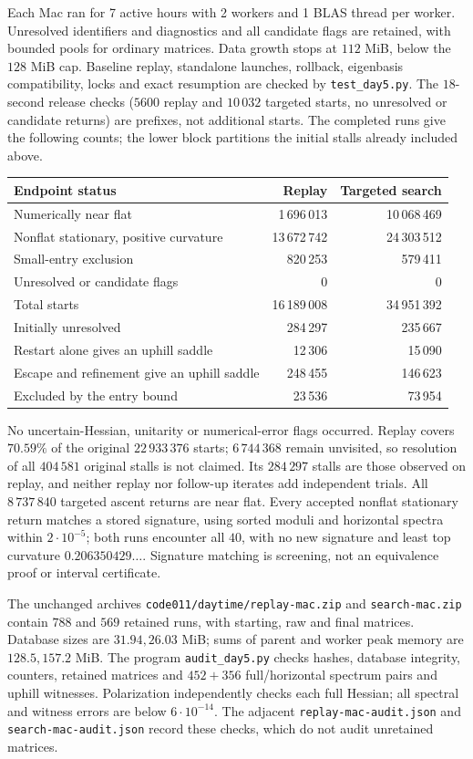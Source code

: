 \documentclass[11pt,a4paper]{article}
\begin{document}
Each Mac ran for 7 active hours with 2 workers and 1 BLAS thread per
worker. Unresolved identifiers and diagnostics and all candidate flags
are retained, with bounded pools for ordinary matrices. Data growth
stops at $112$ MiB, below the $128$ MiB cap. Baseline replay, standalone
launches, rollback, eigenbasis compatibility, locks and exact resumption
are checked by \texttt{test\_day5.py}. The $18$-second release checks
($5600$ replay and $10\,032$ targeted starts, no unresolved or candidate
returns) are prefixes, not additional starts. The completed runs give
the following counts; the lower block partitions the initial stalls
already included above.
\begin{center}
\begin{tabular}{lrr}
\toprule
Endpoint status & Replay & Targeted search\\
\midrule
Numerically near flat &1\,696\,013&10\,068\,469\\
Nonflat stationary, positive curvature &13\,672\,742&24\,303\,512\\
Small-entry exclusion &820\,253&579\,411\\
Unresolved or candidate flags &0&0\\
\midrule
Total starts &16\,189\,008&34\,951\,392\\
\midrule
Initially unresolved &284\,297&235\,667\\
Restart alone gives an uphill saddle &12\,306&15\,090\\
Escape and refinement give an uphill saddle &248\,455&146\,623\\
Excluded by the entry bound &23\,536&73\,954\\
\bottomrule
\end{tabular}
\end{center}
No uncertain-Hessian, unitarity or numerical-error flags occurred.
Replay covers $70.59\%$ of the original $22\,933\,376$ starts;
$6\,744\,368$ remain unvisited, so resolution of all $404\,581$
original stalls is not claimed. Its $284\,297$ stalls are those observed
on replay, and neither replay nor follow-up iterates add independent trials.
All $8\,737\,840$ targeted ascent returns are near flat. Every accepted
nonflat stationary return matches a stored signature, using sorted
moduli and horizontal spectra within $2\cdot10^{-5}$; both runs
encounter all $40$, with no new signature and least top curvature
$0.206350429\ldots$. Signature matching is screening, not an
equivalence proof or interval certificate.

The unchanged archives \texttt{code011/daytime/replay-mac.zip} and
\texttt{search-mac.zip} contain $788$ and $569$ retained runs, with
starting, raw and final matrices. Database sizes are $31.94,26.03$ MiB;
sums of parent and worker peak memory are $128.5,157.2$ MiB.
The program \texttt{audit\_day5.py} checks hashes, database integrity,
counters, retained matrices and $452+356$ full/horizontal spectrum
pairs and uphill witnesses. Polarization independently checks each
full Hessian; all spectral and witness errors are below $6\cdot10^{-14}$.
The adjacent \texttt{replay-mac-audit.json} and
\texttt{search-mac-audit.json} record these checks, which do not audit
unretained matrices.
\end{document}
